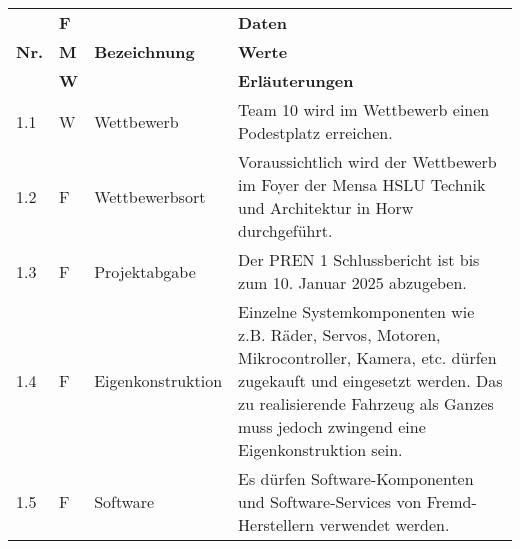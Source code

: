 \documentclass[main.tex]{subfiles} %
\begin{document}
\begin{tabular}{|l|p{0.5cm}|p{4cm}|p{10cm}|}
  \hline
               & \textbf{F} &                      & \textbf{Daten}                                                                                                                                                                                                               \\
  \textbf{Nr.} & \textbf{M} & \textbf{Bezeichnung} & \textbf{Werte}                                                                                                                                                                                                               \\
               & \textbf{W} &                      & \textbf{Erläuterungen}                                                                                                                                                                                                       \\
  \hline
  1.1          & W          & Wettbewerb           & Team 10 wird im Wettbewerb einen Podestplatz erreichen.                                                                                                                                                                      \\
  \hline
  1.2          & F          & Wettbewerbsort       & Voraussichtlich wird der Wettbewerb im Foyer der Mensa HSLU Technik und Architektur in Horw durchgeführt.                                                                                                                    \\
  \hline
  1.3          & F          & Projektabgabe        & Der PREN 1 Schlussbericht ist bis zum 10. Januar 2025 abzugeben.                                                                                                                                                             \\
  \hline
  1.4          & F          & Eigenkonstruktion    & Einzelne Systemkomponenten wie z.B. Räder, Servos, Motoren, Mikrocontroller, Kamera, etc. dürfen zugekauft und eingesetzt werden. Das zu realisierende Fahrzeug als Ganzes muss jedoch zwingend eine Eigenkonstruktion sein. \\
  \hline
  1.5          & F          & Software             & Es dürfen Software-Komponenten und Software-Services von Fremd-Herstellern verwendet werden.                                                                                                                                 \\

\end{tabular}
\end{document}
